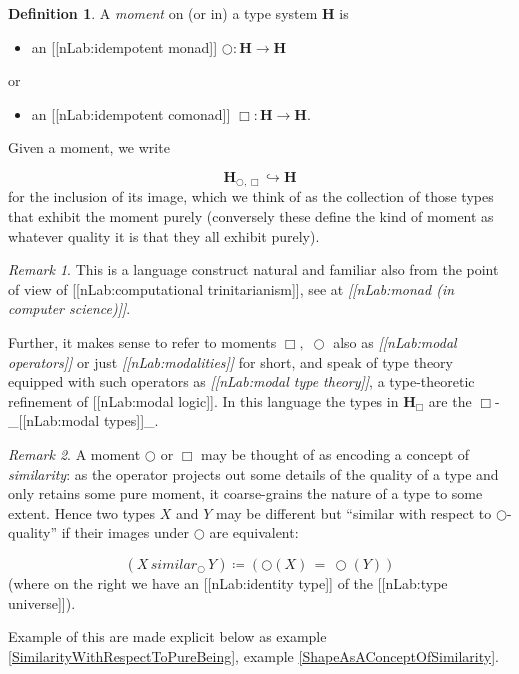 \documentclass[12pt,titlepage]{article}
\theoremstyle{plain}
\theoremstyle{definition}
\newtheorem{defn}{Definition}
\theoremstyle{remark}
\newtheorem{remark}{Remark}
\begin{document}
\begin{defn}
\label{Moments}\hypertarget{Moments}{}
A \emph{moment} on (or in) a type system $\mathbf{H}$ is

\begin{itemize}%
\item an [[nLab:idempotent monad]] $\bigcirc \colon \mathbf{H} \to \mathbf{H}$

\end{itemize}
or

\begin{itemize}%
\item an [[nLab:idempotent comonad]] $\Box \colon \mathbf{H} \to \mathbf{H}$.

\end{itemize}
Given a moment, we write

\begin{displaymath}
\mathbf{H}_{\bigcirc, \Box} \hookrightarrow \mathbf{H}
\end{displaymath}
for the inclusion of its image, which we think of as the collection of those types that exhibit the moment purely (conversely these define the kind of moment as whatever quality it is that they all exhibit purely).

\end{defn}
\begin{remark}
\label{}\hypertarget{}{}
This is a language construct natural and familiar also from the point of view of [[nLab:computational trinitarianism]], see at \emph{[[nLab:monad (in computer science)]]}.

Further, it makes sense to refer to moments $\Box,\;\bigcirc$ also as \emph{[[nLab:modal operators]]} or just \emph{[[nLab:modalities]]} for short, and speak of type theory equipped with such operators as \emph{[[nLab:modal type theory]]}, a type-theoretic refinement of [[nLab:modal logic]]. In this language the types in $\mathbf{H}_{\Box}$ are the $\Box$-\_[[nLab:modal types]]\_.

\end{remark}
\begin{remark}
\label{MomentsAndSimilarity}\hypertarget{MomentsAndSimilarity}{}
A moment $\bigcirc$ or $\Box$ may be thought of as encoding a concept of \emph{similarity}: as the operator projects out some details of the quality of a type and only retains some pure moment, it coarse-grains the nature of a type to some extent. Hence two types $X$ and $Y$ may be different but ``similar with respect to $\bigcirc$-quality'' if their images under $\bigcirc$ are equivalent:

\begin{displaymath}
(X \,similar_{\bigcirc}\, Y)
  \coloneqq
  (\bigcirc(X) \,= \, \bigcirc(Y))
\end{displaymath}
(where on the right we have an [[nLab:identity type]] of the [[nLab:type universe]]).

\end{remark}
Example of this are made explicit below as example \ref{SimilarityWithRespectToPureBeing}, example \ref{ShapeAsAConceptOfSimilarity}.
\end{document}
